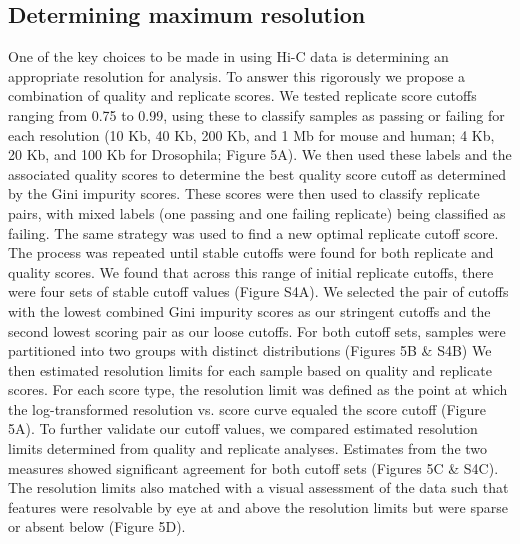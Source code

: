 
\subsection{Determining maximum resolution}

One of the key choices to be made in using Hi-C data is determining an appropriate resolution for analysis. To answer this rigorously we propose a combination of quality and replicate scores. We tested replicate score cutoffs ranging from 0.75 to 0.99, using these to classify samples as passing or failing for each resolution (10 Kb, 40 Kb, 200 Kb, and 1 Mb for mouse and human; 4 Kb, 20 Kb, and 100 Kb for Drosophila; Figure 5A). We then used these labels and the associated quality scores to determine the best quality score cutoff as determined by the Gini impurity scores. These scores were then used to classify replicate pairs, with mixed labels (one passing and one failing replicate) being classified as failing. The same strategy was used to find a new optimal replicate cutoff score. The process was repeated until stable cutoffs were found for both replicate and quality scores. We found that across this range of initial replicate cutoffs, there were four sets of stable cutoff values (Figure S4A). We selected the pair of cutoffs with the lowest combined Gini impurity scores as our stringent cutoffs and the second lowest scoring pair as our loose cutoffs. For both cutoff sets, samples were partitioned into two groups with distinct distributions (Figures 5B \& S4B) We then estimated resolution limits for each sample based on quality and replicate scores. For each score type, the resolution limit was defined as the point at which the log-transformed resolution vs. score curve equaled the score cutoff (Figure 5A). To further validate our cutoff values, we compared estimated resolution limits determined from quality and replicate analyses. Estimates from the two measures showed significant agreement for both cutoff sets (Figures 5C \& S4C). The resolution limits also matched with a visual assessment of the data such that features were resolvable by eye at and above the resolution limits but were sparse or absent below (Figure 5D).

